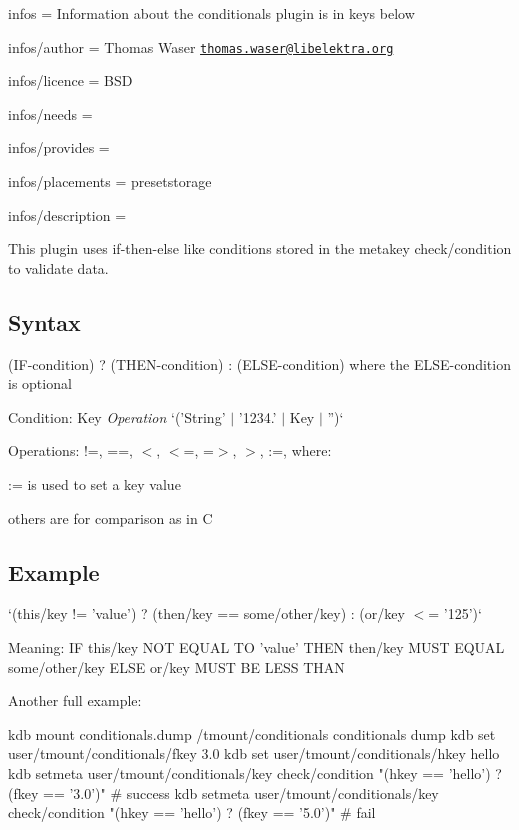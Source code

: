 
\begin{DoxyItemize}
\item infos = Information about the conditionals plugin is in keys below
\item infos/author = Thomas Waser \href{mailto:thomas.waser@libelektra.org}{\tt thomas.\+waser@libelektra.\+org}
\item infos/licence = B\+S\+D
\item infos/needs =
\item infos/provides =
\item infos/placements = presetstorage
\item infos/description =
\end{DoxyItemize}

This plugin uses if-\/then-\/else like conditions stored in the metakey {\ttfamily check/condition} to validate data.

\subsection*{Syntax}

{\ttfamily (I\+F-\/condition) ? (T\+H\+E\+N-\/condition) \+: (E\+L\+S\+E-\/condition)} where the E\+L\+S\+E-\/condition is optional

Condition\+: {\ttfamily Key} {\itshape Operation} `('String' $\vert$ '1234.' $\vert$ Key $\vert$ '')`

Operations\+: {\ttfamily !=, ==, $<$, $<$=, =$>$, $>$, \+:=}, where\+:


\begin{DoxyItemize}
\item {\ttfamily \+:=} is used to set a key value
\item others are for comparison as in C
\end{DoxyItemize}

\subsection*{Example}

`(this/key != 'value') ? (then/key == some/other/key) \+: (or/key $<$= '125')`

Meaning\+: I\+F {\ttfamily this/key} N\+O\+T E\+Q\+U\+A\+L T\+O {\ttfamily 'value'} T\+H\+E\+N {\ttfamily then/key} M\+U\+S\+T E\+Q\+U\+A\+L {\ttfamily some/other/key} E\+L\+S\+E {\ttfamily or/key} M\+U\+S\+T B\+E L\+E\+S\+S T\+H\+A\+N {}

Another full example\+: \begin{DoxyVerb}kdb mount conditionals.dump /tmount/conditionals conditionals dump
kdb set user/tmount/conditionals/fkey 3.0
kdb set user/tmount/conditionals/hkey hello
kdb setmeta user/tmount/conditionals/key check/condition "(hkey == 'hello') ? (fkey == '3.0')" # success
kdb setmeta user/tmount/conditionals/key check/condition "(hkey == 'hello') ? (fkey == '5.0')" # fail\end{DoxyVerb}
 
